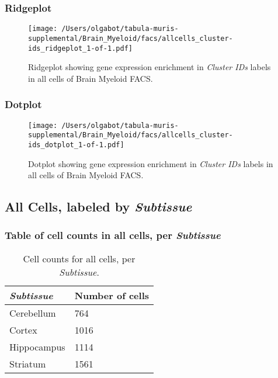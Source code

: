 \clearpage

\subsubsection{Ridgeplot}
\begin{figure}[h]
\centering
\texttt{[image: /Users/olgabot/tabula-muris-supplemental/Brain\_Myeloid/facs/allcells\_cluster-ids\_ridgeplot\_1-of-1.pdf]}

\caption{ Ridgeplot  showing gene expression enrichment in \emph{Cluster IDs} labels in all cells of Brain Myeloid FACS. }
\end{figure}


\clearpage

\subsubsection{Dotplot}
\begin{figure}[h]
\centering
\texttt{[image: /Users/olgabot/tabula-muris-supplemental/Brain\_Myeloid/facs/allcells\_cluster-ids\_dotplot\_1-of-1.pdf]}

\caption{ Dotplot  showing gene expression enrichment in \emph{Cluster IDs} labels in all cells of Brain Myeloid FACS. }
\end{figure}


\clearpage

\subsection{All Cells, labeled by \emph{Subtissue}}
\subsubsection{Table of cell counts in all cells, per \emph{Subtissue}}\begin{table}[h]
\centering
\label{my-label}
\begin{tabular}{@{}ll@{}}
\toprule

\emph{Subtissue}& Number of cells \\ \midrule
Cerebellum & 764 \\

Cortex & 1016 \\

Hippocampus & 1114 \\

Striatum & 1561 \\
\bottomrule
\end{tabular}
\caption{Cell counts for all cells, per \emph{Subtissue}.}
\end{table}

